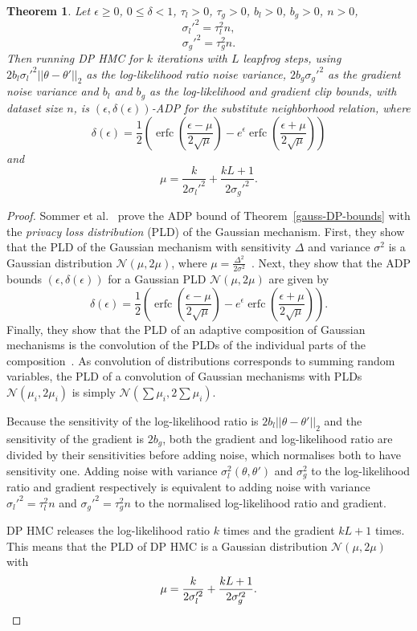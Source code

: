 \documentclass[english,twoside,openright]{HYgraduMLDS}
\newtheorem{theorem}{Theorem}
\newcommand{\caln}{{\mathcal{N}}}
\DeclareMathOperator{\erfc}{erfc}
\begin{document}
\begin{theorem}\label{dp_hmc_theorem_adp}
  Let \(\epsilon \geq 0\), \(0 \leq \delta < 1\), \(\tau_{l} > 0\),
  \(\tau_{g} > 0\), \(b_{l} > 0\), \(b_{g} > 0\), \(n > 0\),
  \[
    \sigma_{l}'^{2} = \tau_{l}^{2}n,
  \]
  \[
    \sigma_{g}'^{2} = \tau_{g}^{2}n.
  \]
  Then running DP HMC for \(k\) iterations with \(L\) leapfrog steps,
  using \(2b_{l}\sigma_{l}'^{2}||\theta - \theta'||_{2}\) as the log-likelihood ratio
  noise variance, \(2b_{g}\sigma_{g}'^{2}\) as the gradient noise variance
  and \(b_{l}\) and \(b_{g}\) as the log-likelihood and gradient clip bounds,
  with dataset size \(n\), is \((\epsilon, \delta(\epsilon))\)-ADP for the
  substitute neighborhood relation, where
  \[
    \delta(\epsilon) = \frac{1}{2}\left(
      \erfc\left(\frac{\epsilon - \mu}{2\sqrt{\mu}}\right)
      - e^{\epsilon}\erfc\left(\frac{\epsilon + \mu}{2\sqrt{\mu}}\right)\right)
  \]
  and
  \[
    \mu = \frac{k}{2\sigma_{l}'^{2}} + \frac{kL + 1}{2\sigma_{g}'^{2}}.
  \]
\end{theorem}
\begin{proof}
Sommer et al.~\cite{Sommer2019} prove the ADP bound of Theorem~\ref{gauss-DP-bounds} with
the \emph{privacy loss distribution} (PLD) of the Gaussian mechanism. First, they
show that the PLD of the Gaussian mechanism with sensitivity \(\Delta\) and variance
\(\sigma^{2}\) is a Gaussian distribution
\(\caln(\mu, 2\mu)\), where \(\mu = \frac{\Delta^{2}}{2\sigma^{2}}\)~\cite[Lemma 11]{Sommer2019}.
Next, they show that the ADP bounds \((\epsilon, \delta(\epsilon))\) for a
Gaussian PLD \(\caln(\mu, 2\mu)\) are given by~\cite[Lemma 12]{Sommer2019}
\[
  \delta(\epsilon) = \frac{1}{2}\left(
    \erfc\left(\frac{\epsilon - \mu}{2\sqrt{\mu}}\right)
    - e^{\epsilon}\erfc\left(\frac{\epsilon + \mu}{2\sqrt{\mu}}\right)\right).
\]
Finally, they show that the PLD of an adaptive composition of Gaussian mechanisms
is the convolution of
the PLDs of the individual parts of the composition~\cite[Theorem 1]{Sommer2019}.
As convolution of distributions corresponds to summing random variables, the PLD of a
convolution of Gaussian mechanisms with PLDs \(\caln(\mu_{i}, 2\mu_{i})\) is
simply \(\caln(\sum \mu_{i}, 2\sum \mu_{i})\).

Because the sensitivity of the log-likelihood ratio is
\(2b_{l}||\theta - \theta'||_{2}\) and the sensitivity of the gradient is
\(2b_{g}\), both the gradient and log-likelihood ratio are divided by their
sensitivities before adding noise, which normalises both to have sensitivity
one. Adding noise with variance \(\sigma_{l}^2(\theta, \theta')\)
and \(\sigma_{g}^{2}\) to the log-likelihood ratio and gradient respectively
is equivalent to adding noise with variance
\(\sigma_{l}'^{2} = \tau_{l}^{2}n\) and \(\sigma_{g}'^{2} = \tau_{g}^{2}n\)
to the normalised log-likelihood ratio and gradient.

DP HMC releases the log-likelihood ratio \(k\) times and the gradient
\(kL + 1\) times. This means that the PLD of DP HMC is a Gaussian distribution
\(\caln(\mu, 2\mu)\) with
\[
  \mu = \frac{k}{2\sigma_{l}'^{2}} + \frac{kL + 1}{2\sigma_{g}'^{2}}.
  \qedhere
\]
\end{proof}
\end{document}
